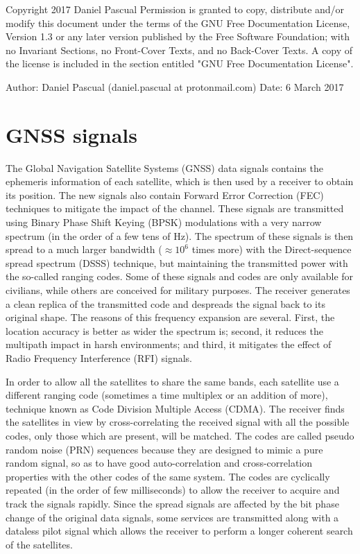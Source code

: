 \documentclass[openany,10pt,twoside,a4paper]{book}
\begin{document}
\pagestyle{fancy}
\fancyhf{}
\renewcommand{\headrulewidth}{0pt}
\fancyfoot[CE,CO]{\thepage}


\noindent  Copyright 2017 Daniel Pascual \newline
\noindent Permission is granted to copy, distribute and/or modify this document under the terms of the GNU Free Documentation License, Version 1.3 or any later version published by the Free Software Foundation; with no Invariant Sections, no Front-Cover Texts, and no Back-Cover Texts. A copy of the license is included in the section entitled "GNU Free Documentation License".  \newline  \newline

\noindent Author: Daniel Pascual (daniel.pascual at protonmail.com)  \newline
\noindent Date: 6 March 2017 


\chapter{GNSS signals}
The Global Navigation Satellite Systems (GNSS) data signals contains the ephemeris information of each satellite, which is then used by a receiver to obtain its position. The new signals also contain Forward Error Correction (FEC) techniques to mitigate the impact of the channel. These signals are transmitted using Binary Phase Shift Keying (BPSK) modulations with a very narrow spectrum (in the order of a few tens of Hz). The spectrum of these signals is then spread to a much larger bandwidth ($\approx 10^6$ times more) with the Direct-sequence spread spectrum (DSSS) technique, but maintaining the transmitted power with the so-called ranging codes. Some of these signals and codes are only available for civilians, while others are conceived for military purposes. The receiver generates a clean replica of the transmitted code and despreads the signal back to its original shape. The reasons of this frequency expansion are several. First, the location accuracy is better as wider the spectrum is; second, it reduces the multipath impact in harsh environments; and third, it mitigates the effect of Radio Frequency Interference (RFI) signals. 

In order to allow all the satellites to share the same bands, each satellite use a different ranging code (sometimes a time multiplex or an addition of more), technique known as Code Division Multiple Access (CDMA). The receiver finds the satellites in view by cross-correlating the received signal with all the possible codes, only those which are present, will be matched. The codes are called pseudo random noise (PRN) sequences because they are designed to mimic a pure random signal, so as to have good auto-correlation and cross-correlation properties with the other codes of the same system. The codes are cyclically repeated (in the order of few milliseconds) to allow the receiver to acquire and track the signals rapidly. Since the spread signals are affected by the bit phase change of the original data signals, some services are transmitted along with a dataless pilot signal which allows the receiver to perform a longer coherent search of the satellites.
\end{document}
